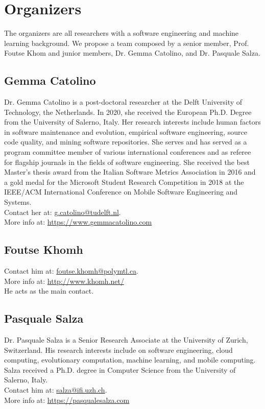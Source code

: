 
\section{Organizers}

The organizers are all researchers with a software engineering and machine learning background.
We propose a team composed by a senior member, \ie Prof. Foutse Khom and junior members, \ie Dr. Gemma Catolino, and Dr. Pasquale Salza.

\label{sec:organizers}
\subsection{Gemma Catolino}
Dr. Gemma Catolino is a post-doctoral researcher at the Delft University of Technology, the Netherlands.
In 2020, she received the European Ph.D. Degree from the University of Salerno, Italy.
Her research interests include human factors in software maintenance and evolution, empirical software engineering, source code quality, and mining software repositories.
She serves and has served as a program committee member of various international conferences and as referee for flagship journals in the fields of software engineering.
She received the best Master's thesis award from the Italian Software Metrics Association in 2016 and a gold medal for the Microsoft Student Research Competition in 2018 at the IEEE/ACM International Conference on Mobile Software Engineering and Systems.\\
Contact her at: \href{mailto:g.catolino@tudelft.nl}{g.catolino@tudelft.nl}.\\
More info at: \url{https://www.gemmacatolino.com}

\subsection{Foutse Khomh}
Contact him at: \href{mailto:foutse.khomh@polymtl.ca}{foutse.khomh@polymtl.ca}.\\
More info at: \url{http://www.khomh.net/}\\
He acts as the main contact.

\subsection{Pasquale Salza}
Dr. Pasquale Salza is a Senior Research Associate at the University of Zurich, Switzerland.
His research interests include on software engineering, cloud computing, evolutionary computation, machine learning, and mobile computing.
Salza received a Ph.D. degree in Computer Science from the University of Salerno, Italy.\\
Contact him at: \href{mailto:salza@ifi.uzh.ch}{salza@ifi.uzh.ch}.\\
More info at: \url{https://pasqualesalza.com}
